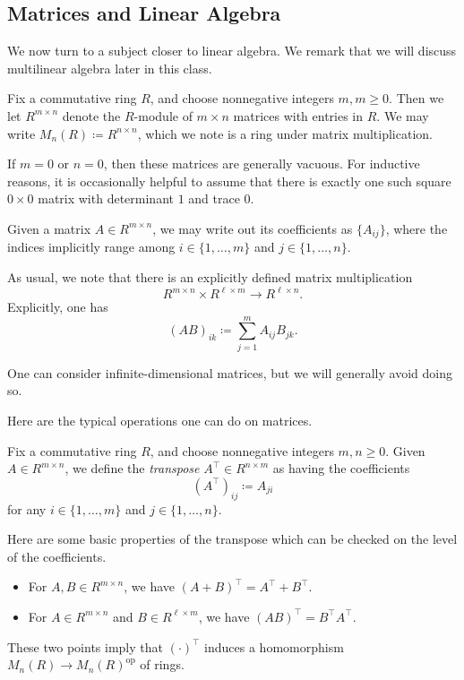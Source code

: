\documentclass[../notes.tex]{subfiles}
\begin{document}
\subsection{Matrices and Linear Algebra}
We now turn to a subject closer to linear algebra. We remark that we will discuss multilinear algebra later in this class.
\begin{notation}
	Fix a commutative ring $R$, and choose nonnegative integers $m,m\ge0$. Then we let $R^{m\times n}$ denote the $R$-module of $m\times n$ matrices with entries in $R$. We may write $M_n(R)\coloneqq R^{n\times n}$, which we note is a ring under matrix multiplication.
\end{notation}
\begin{remark}
	If $m=0$ or $n=0$, then these matrices are generally vacuous. For inductive reasons, it is occasionally helpful to assume that there is exactly one such square $0\times0$ matrix with determinant $1$ and trace $0$.
\end{remark}
Given a matrix $A\in R^{m\times n}$, we may write out its coefficients as $\{A_{ij}\}$, where the indices implicitly range among $i\in\{1,\ldots,m\}$ and $j\in\{1,\ldots,n\}$.
\begin{remark}
	As usual, we note that there is an explicitly defined matrix multiplication
	\[R^{m\times n}\times R^{\ell\times m}\to R^{\ell\times n}.\]
	Explicitly, one has
	\[(AB)_{ik}\coloneqq\sum_{j=1}^mA_{ij}B_{jk}.\]
\end{remark}
\begin{remark}
	One can consider infinite-dimensional matrices, but we will generally avoid doing so.
\end{remark}
Here are the typical operations one can do on matrices.
\begin{definition}[transpose]
	Fix a commutative ring $R$, and choose nonnegative integers $m,n\ge0$. Given $A\in R^{m\times n}$, we define the \textit{transpose} $A^\intercal\in R^{n\times m}$ as having the coefficients
	\[\left(A^\intercal\right)_{ij}\coloneqq A_{ji}\]
	for any $i\in\{1,\ldots,m\}$ and $j\in\{1,\ldots,n\}$.
\end{definition}
\begin{remark}
	Here are some basic properties of the transpose which can be checked on the level of the coefficients.
	\begin{itemize}
		\item For $A,B\in R^{m\times n}$, we have $(A+B)^\intercal=A^\intercal+B^\intercal$.
		\item For $A\in R^{m\times n}$ and $B\in R^{\ell\times m}$, we have $(AB)^\intercal=B^\intercal A^\intercal$.
	\end{itemize}
	These two points imply that $(\cdot)^\intercal$ induces a homomorphism $M_n(R)\to M_n(R)^\mathrm{op}$ of rings.
\end{remark}
\end{document}
